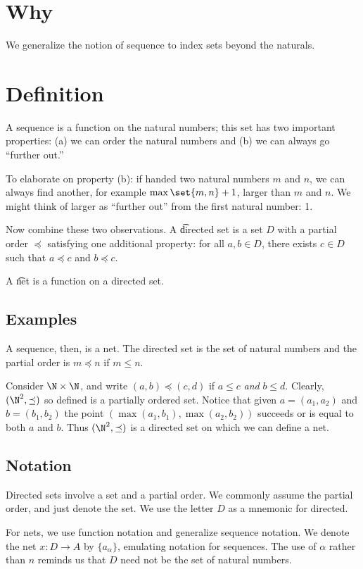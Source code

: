 
\section*{Why}

We generalize the notion of sequence to index sets beyond the naturals.
\section*{Definition}

A sequence is a function on the natural numbers; this set has two important properties: (a) we can order the natural numbers and (b) we can always go ``further out.''

To elaborate on property (b):
if handed two natural numbers
$m$ and $n$,
we can always find another,
for example $\max\set{m,n}+1$,
larger than $m$ and $n$.
We might think of larger as
``further out'' from the
first natural number: 1.

Now combine these two observations.
A \t{directed set} is a set $D$ with a partial order $\preceq$ satisfying one additional property: for all $a, b \in D$, there exists $c \in D$ such that $a \preceq c$ and $b \preceq c$.

A \t{net} is a function on a directed set.

\subsection*{Examples}

A sequence, then, is a net.
The directed set is the set of natural numbers and the partial order is $m \preceq n$ if $m \leq n$.

Consider $\N   \times  \N  $, and write $(a,b) \preceq (c, d)$ if $a \leq c$ \textit{and} $b \leq d$.
Clearly, $(\N  ^2, \preceq)$ so defined is a partially ordered set.
Notice that given $a = (a_1, a_2)$ and $b = (b_1, b_2)$ the point $(\max(a_1, b_1), \max(a_2, b_2))$ succeeds or is equal to both $a$ and $b$.
Thus $(\N  ^2, \preceq)$ is a directed set on which we can define a net.

\subsection*{Notation}

Directed sets involve a set and a partial order.
We commonly assume the partial order, and just denote the set.
We use the letter $D$ as a mnemonic for directed.

For nets, we use function notation and generalize sequence notation.
We denote the net $x: D \to A$ by $\{a_{\alpha }\}$, emulating notation for sequences.
The use of $\alpha $ rather than $n$ reminds us that $D$ need not be the set of natural numbers.
